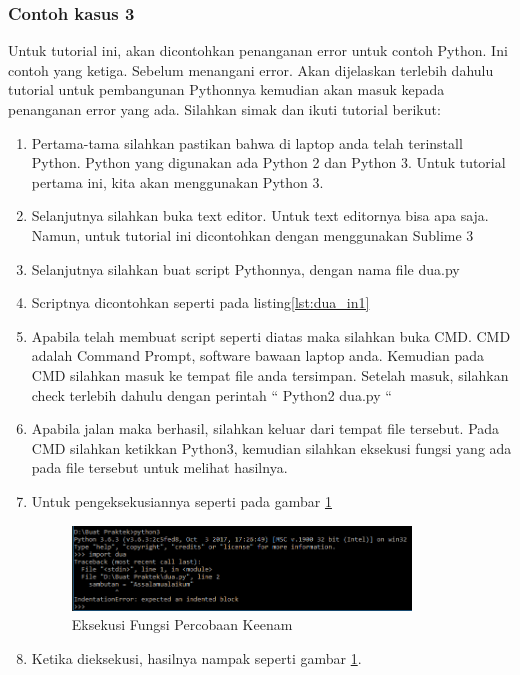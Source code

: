 \subsubsection{Contoh kasus 3}
Untuk tutorial ini, akan dicontohkan penanganan error untuk contoh Python. Ini contoh yang ketiga. Sebelum menangani error. Akan dijelaskan terlebih dahulu tutorial untuk pembangunan Pythonnya kemudian akan masuk kepada penanganan error yang ada. Silahkan simak dan ikuti tutorial berikut: 
\begin{enumerate}
\item Pertama-tama silahkan pastikan bahwa di laptop anda telah terinstall Python. Python yang digunakan ada Python 2 dan Python 3. Untuk tutorial pertama ini, kita akan menggunakan Python 3.
\item Selanjutnya silahkan buka text editor. Untuk text editornya bisa apa saja. Namun, untuk tutorial ini dicontohkan dengan menggunakan Sublime 3
\item Selanjutnya silahkan buat script Pythonnya, dengan nama file dua.py
\item Scriptnya dicontohkan seperti pada listing\ref{lst:dua_in1}

\item Apabila telah membuat script seperti diatas maka silahkan buka CMD. CMD adalah Command Prompt, software bawaan laptop anda. Kemudian pada CMD silahkan masuk ke tempat file anda tersimpan. Setelah masuk, silahkan check terlebih dahulu dengan perintah “ Python2 dua.py “
\item Apabila jalan maka berhasil, silahkan keluar dari tempat file tersebut. Pada CMD silahkan ketikkan Python3, kemudian silahkan eksekusi fungsi yang ada pada file tersebut untuk melihat hasilnya.
\item Untuk pengeksekusiannya seperti pada gambar \ref{fig:eksekusi_fungsi6}
\begin{figure}[!htbp]
	\centerline{\includegraphics[width=0.85\textwidth]{figures/8/eksekusi_fungsi6.png}}
	\caption{Eksekusi Fungsi Percobaan Keenam}
	\label{fig:eksekusi_fungsi6}
\end{figure}
\item Ketika dieksekusi, hasilnya nampak seperti gambar \ref{fig:eksekusi_fungsi6}.

\end{enumerate}
